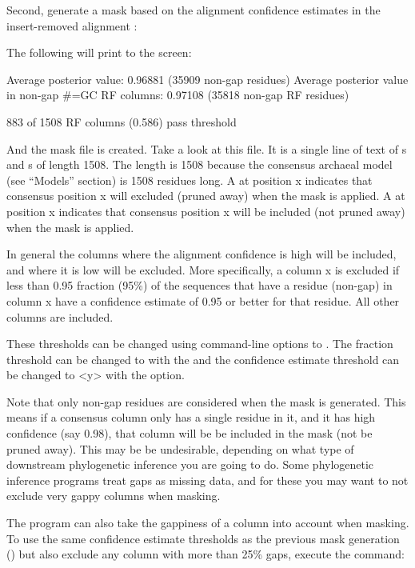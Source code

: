 Second, generate a mask based on the alignment confidence estimates
in the insert-removed alignment :


The following will print to the screen:

\begin{sreoutput}
Average posterior value:                            0.96881 (35909 non-gap residues)
Average posterior value in non-gap #=GC RF columns: 0.97108 (35818 non-gap RF residues)


883 of 1508 RF columns (0.586) pass threshold
\end{sreoutput}

And the mask file  is created. Take a look at this
file. It is a single line of text of s and s of length
1508. The length is 1508 because the consensus archaeal model (see
``Models'' section) is 1508 residues long. A  at position x
indicates that consensus position x will excluded (pruned away) when the mask
is applied. A  at position x indicates that consensus position
x will be included (not pruned away) when the mask is applied. 

In general the columns where the alignment confidence is high will be
included, and where it is low will be excluded. More specifically, a
column x is excluded if less than 0.95 fraction (95\%) of the sequences that
have a residue (non-gap) in column x have a confidence estimate of
0.95 or better for that residue. All other columns are included.

These thresholds can be changed using command-line options to 
. The fraction threshold can be changed to
 with the  and the confidence estimate
threshold can be changed to {<y>} with the 
option.

Note that only non-gap residues are considered when the mask is
generated. This means if a consensus column only has a single residue
in it, and it has high confidence (say 0.98), that column will be
be included in the mask (not be pruned away). This may be be
undesirable, depending on what type of downstream phylogenetic inference
you are going to do. Some phylogenetic inference programs treat gaps
as missing data, and for these you may want to not exclude very gappy
columns when masking. 

The  program can also take the gappiness of a
column into account when masking. To use the same confidence estimate
thresholds as the previous  mask generation
() but also exclude any column 
with more than 25\% gaps, execute the command:

